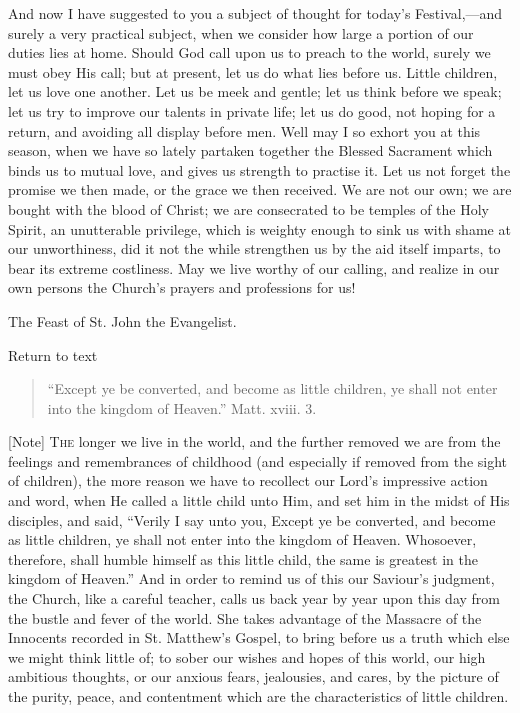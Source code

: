 And now I have suggested to you a subject of thought for today's
Festival,—and surely a very practical subject, when we consider how
large a portion of our duties lies at home. Should God call upon us to
preach to the world, surely we must obey His call; but at present, let
us do what lies before us. Little children, let us love one another.
Let us be meek and gentle; let us think before we speak; let us try to
improve our talents in private life; let us do good, not hoping for a
return, and avoiding all display before men. Well may I so exhort you
at this season, when we have so lately partaken together the Blessed
Sacrament which binds us to mutual love, and gives us strength to
practise it. Let us not forget the promise we then made, or the grace
we then received. We are not our own; we are bought with the blood of
Christ; we are consecrated to be temples of the Holy Spirit, an
unutterable privilege, which is weighty enough to sink us with shame
at our unworthiness, did it not the while strengthen us by the aid
itself imparts, to bear its extreme costliness. May we live worthy of
our calling, and realize in our own persons the Church's prayers and
professions for us!


The Feast of St. John the Evangelist.

Return to text


\begin{quote}

``Except ye be converted, and become as
little children, ye shall not enter into the kingdom of
Heaven.'' Matt. xviii. 3.

\end{quote}

[Note] T\textsc{he} longer we live in the
world, and the further removed we are from the feelings and
remembrances of childhood (and especially if removed from the sight of
children), the more reason we have to recollect our Lord's impressive
action and word, when He called a little child unto Him, and set him
in the midst of His disciples, and said, ``Verily I say unto you,
Except ye be converted, and become as little children, ye shall not
enter into the kingdom of Heaven. Whosoever, therefore, shall humble
himself as this little child, the same is greatest in the kingdom of
Heaven.'' And in order to remind us of this our Saviour's
judgment, the Church, like a careful teacher, calls us back year by
year upon this day from the bustle and fever of the world. She takes
advantage of the Massacre of the Innocents recorded in St. Matthew's
Gospel, to bring before us a truth which else we might think little
of; to sober our wishes and hopes of this world, our high ambitious
thoughts, or our anxious fears, jealousies, and cares, by the picture
of the purity, peace, and contentment which are the characteristics of
little children.

